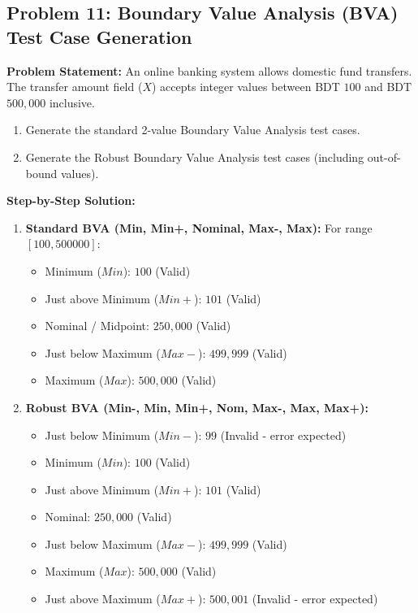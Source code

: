 \subsection*{Problem 11: Boundary Value Analysis (BVA) Test Case Generation}
\textbf{Problem Statement:} An online banking system allows domestic fund transfers. The transfer amount field ($X$) accepts integer values between BDT $100$ and BDT $500,000$ inclusive.
\begin{enumerate}[label=(\alph*)]
    \item Generate the standard 2-value Boundary Value Analysis test cases.
    \item Generate the Robust Boundary Value Analysis test cases (including out-of-bound values).
\end{enumerate}

\textbf{Step-by-Step Solution:}
\begin{enumerate}[label=(\alph*)]
    \item \textbf{Standard BVA (Min, Min+, Nominal, Max-, Max):}
    For range $[100, 500000]$:
    \begin{itemize}
        \item Minimum ($Min$): $100$ (Valid)
        \item Just above Minimum ($Min+$): $101$ (Valid)
        \item Nominal / Midpoint: $250,000$ (Valid)
        \item Just below Maximum ($Max-$): $499,999$ (Valid)
        \item Maximum ($Max$): $500,000$ (Valid)
    \end{itemize}
    \item \textbf{Robust BVA (Min-, Min, Min+, Nom, Max-, Max, Max+):}
    \begin{itemize}
        \item Just below Minimum ($Min-$): $99$ (Invalid - error expected)
        \item Minimum ($Min$): $100$ (Valid)
        \item Just above Minimum ($Min+$): $101$ (Valid)
        \item Nominal: $250,000$ (Valid)
        \item Just below Maximum ($Max-$): $499,999$ (Valid)
        \item Maximum ($Max$): $500,000$ (Valid)
        \item Just above Maximum ($Max+$): $500,001$ (Invalid - error expected)
    \end{itemize}
\end{enumerate}

